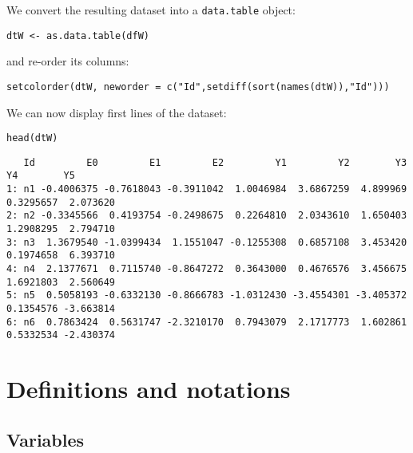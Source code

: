 \documentclass{article}
\begin{document}
We convert the resulting dataset into a \texttt{data.table} object:
\lstset{language=r,label= ,caption= ,captionpos=b,numbers=none}
\begin{lstlisting}
dtW <- as.data.table(dfW)
\end{lstlisting}

and re-order its columns:
\lstset{language=r,label= ,caption= ,captionpos=b,numbers=none}
\begin{lstlisting}
setcolorder(dtW, neworder = c("Id",setdiff(sort(names(dtW)),"Id")))
\end{lstlisting}

We can now display first lines of the dataset:
\lstset{language=r,label= ,caption= ,captionpos=b,numbers=none}
\begin{lstlisting}
head(dtW)
\end{lstlisting}
\begin{verbatim}
   Id         E0         E1         E2         Y1         Y2        Y3        Y4        Y5
1: n1 -0.4006375 -0.7618043 -0.3911042  1.0046984  3.6867259  4.899969 0.3295657  2.073620
2: n2 -0.3345566  0.4193754 -0.2498675  0.2264810  2.0343610  1.650403 1.2908295  2.794710
3: n3  1.3679540 -1.0399434  1.1551047 -0.1255308  0.6857108  3.453420 0.1974658  6.393710
4: n4  2.1377671  0.7115740 -0.8647272  0.3643000  0.4676576  3.456675 1.6921803  2.560649
5: n5  0.5058193 -0.6332130 -0.8666783 -1.0312430 -3.4554301 -3.405372 0.1354576 -3.663814
6: n6  0.7863424  0.5631747 -2.3210170  0.7943079  2.1717773  1.602861 0.5332534 -2.430374
\end{verbatim}


\clearpage

\section{Definitions and notations}
\label{sec:orgfe2c5eb}

\subsection{Variables}
\label{sec:org0830296}
\end{document}
